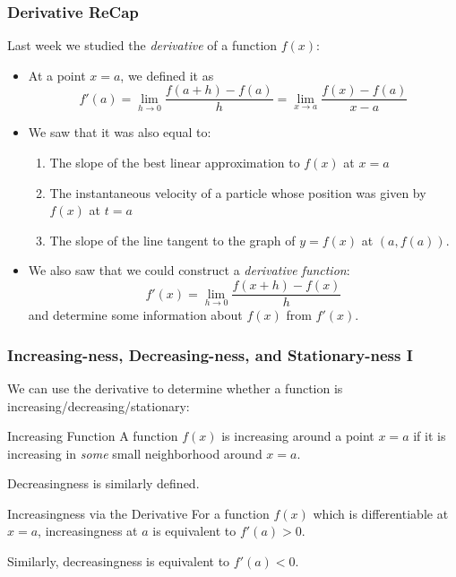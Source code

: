 \documentclass{ltx-talk}
\begin{document}
\begin{frame}
  \frametitle{Derivative ReCap}    

  Last week we studied the \textit{derivative} of a function $f(x)$: \pause
  \begin{itemize}
    \item At a point $x = a$, we defined it as \pause
      \begin{equation}
        f'(a) = \lim\limits_{h \rightarrow 0} \dfrac{f(a + h) - f(a)}{h} = \lim\limits_{x \rightarrow a} \dfrac{f(x) - f(a)}{x - a}
      \end{equation} \pause
    \item We saw that it was also equal to: \pause
      \begin{enumerate}
        \item The slope of the best linear approximation to $f(x)$ at $x = a$ \pause
        \item The instantaneous velocity of a particle whose position was given by $f(x)$ at $t = a$ \pause
        \item The slope of the line tangent to the graph of $y = f(x)$ at $(a, f(a))$. \pause
      \end{enumerate}
    \item We also saw that we could construct a \textit{derivative function}: \pause
      \begin{equation}
        f'(x) = \lim_{h \rightarrow 0} \dfrac{f(x+h) - f(x)}{h}
      \end{equation} \pause
      and determine some information about $f(x)$ from $f'(x)$.
  \end{itemize}
\end{frame}

\begin{frame}
  \frametitle{Increasing-ness, Decreasing-ness, and Stationary-ness I}

  We can use the derivative to determine whether a function is increasing/decreasing/stationary: \pause

  \begin{block}{Increasing Function}
    A function $f(x)$ is increasing around a point $x = a$
    if it is increasing in \textit{some} small neighborhood around $x = a$. \pause
  \end{block}

  Decreasingness is similarly defined. \pause

  \begin{alertblock}{Increasingness via the Derivative}
    For a function $f(x)$ which is differentiable at $x = a$, \pause
    increasingness at $a$ is equivalent to $f'(a) > 0$.

    Similarly, decreasingness is equivalent to $f'(a) < 0$.
  \end{alertblock}
\end{frame}
\end{document}
